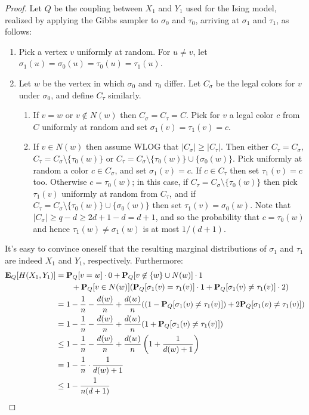 \documentclass[11pt]{article} \usepackage{amssymb}
\newcommand{\E}{{\bf E}} \newcommand{\Cov}{{\bf Cov}}
\begin{document}
\begin{itemize}
\begin{proof}
  Let $Q$ be the coupling between $X_1$ and $Y_1$ used for the Ising model, 
  realized by applying the Gibbs sampler to $\sigma_0$ and $\tau_0$, arriving at 
  $\sigma_1$ and $\tau_1$, as follows:
  \begin{enumerate}
  \item Pick a vertex $v$ uniformly at random. For $u\neq v$, let 
    $\sigma_1(u)=\sigma_0(u)=\tau_0(u)=\tau_1(u)$.
  \item Let $w$ be the vertex in which $\sigma_0$ and $\tau_0$ differ. Let 
    $C_\sigma$ be the legal colors for $v$ under $\sigma_0$, and define
    $C_\tau$ similarly.
    \begin{enumerate}
    \item If $v=w$ or $v \not \in N(w)$ then $C_\sigma=C_\tau=C$. Pick for $v$ a legal 
      color $c$ from $C$ uniformly at random and set $\sigma_1(v)=\tau_1(v)=c$.
    \item If $v \in N(w)$ then assume WLOG that $|C_\sigma|\geq |C_\tau|$.
      Then either $C_\tau=C_\sigma$,  $C_\tau=C_\sigma\setminus \{\tau_0(w)\}$ or
      $C_\tau=C_\sigma\setminus \{\tau_0(w)\}\cup \{\sigma_0(w)\}$.
      Pick uniformly at random
      a color $c\in C_\sigma$, and set $\sigma_1(v)=c$. If $c\in C_\tau$ then
      set $\tau_1(v)=c$ too. Otherwise $c=\tau_0(w)$; in this case, if  
      $C_\tau=C_\sigma\setminus \{\tau_0(w)\}$ 
      then pick $\tau_1(v)$ uniformly at random from $C_\tau$, and if 
      $C_\tau=C_\sigma\setminus \{\tau_0(w)\}\cup \{\sigma_0(w)\}$ then
      set $\tau_1(v)=\sigma_0(w)$. Note that $|C_\sigma|\geq q-d \geq 2d+1-d =d+1$, and
      so the probability that $c=\tau_0(w)$ and hence 
      $\tau_1(w)\neq  \sigma_1(w)$ is at most
      $1/(d+1)$.
    \end{enumerate}
  \end{enumerate}
  It's easy to convince oneself that the resulting marginal distributions 
  of $\sigma_1$ and $\tau_1$ are indeed $X_1$ and $Y_1$, respectively. Furthermore:
  \begin{align*}
    \E_Q[H(X_1,Y_1)] &= \P_Q[v=w]\cdot 0+\P_Q[v\not \in \{w\}\cup N(w)]\cdot 1
    \\ & \quad\quad + \P_Q[v\in N(w)](\P_Q[\sigma_1(v)=\tau_1(v)]\cdot 1 + \P_Q[\sigma_1(v)\neq\tau_1(v)]\cdot 2)
    \\  &= 1-{1\over n}-{d(w)\over n}+{d(w)\over n}((1-\P_Q[\sigma_1(v)\neq\tau_1(v)]) +2\P_Q[\sigma_1(v)\neq\tau_1(v)])
    \\  &= 1-{1\over n}-{d(w)\over n}+{d(w)\over n}(1+\P_Q[\sigma_1(v)\neq\tau_1(v)])
    \\  &\leq 1-{1\over n}-{d(w)\over n}+{d(w)\over n}\left(1+{1\over d(w)+1}\right)
    \\  &= 1-{1\over n}\cdot{1\over d(w)+1}
    \\  &\leq 1-{1\over n(d+1)}
  \end{align*}
\end{proof}



\end{itemize}
\end{document}
